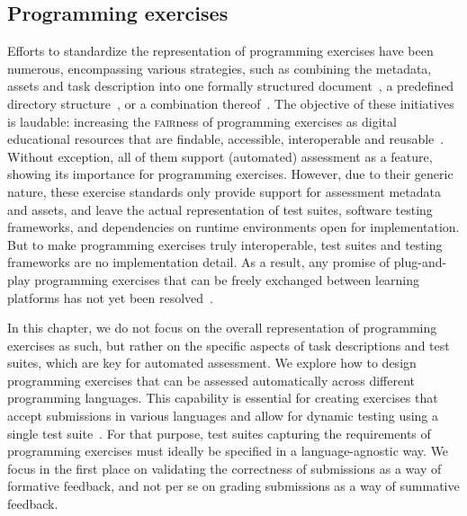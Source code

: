 \documentclass[../main]{subfiles}
\begin{document}
\subsection{Programming exercises}\label{subsec:dsl-programming-exercises}

Efforts to standardize the representation of programming exercises have been numerous, encompassing various strategies, such as combining the metadata, assets and task description into one formally structured document~\autocite{mishraProgrammingExerciseMarkup2023,paivaAnotherProgrammingExercises2020,queirosPexilProgrammingExercises2011,swachaSIPEDomainspecificLanguage2018}, a predefined directory structure~\autocite{verhoeffProgrammingTaskPackages2008}, or a combination thereof~\autocite{edwardsDevelopingCommonFormat2008a,strickrothProFormAXMLbasedExchange2015}.
The objective of these initiatives is laudable: increasing the \textsc{fair}ness of programming exercises as digital educational resources that are findable, accessible, interoperable and reusable~\autocite{wilkinsonFAIRGuidingPrinciples2016}.
Without exception, all of them support (automated) assessment as a feature, showing its importance for programming exercises.
However, due to their generic nature, these exercise standards only provide support for assessment metadata and assets, and leave the actual representation of test suites, software testing frameworks, and dependencies on runtime environments open for implementation.
But to make programming exercises truly interoperable, test suites and testing frameworks are no implementation detail.
As a result, any promise of plug-and-play programming exercises that can be freely exchanged between learning platforms has not yet been resolved~\autocite{ala-mutkaSurveyAutomatedAssessment2005,ihantolaReviewRecentSystems2010,messerAutomatedGradingFeedback2024,paivaAutomatedAssessmentComputer2022}.

In this chapter, we do not focus on the overall representation of programming exercises as such, but rather on the specific aspects of task descriptions and test suites, which are key for automated assessment.
We explore how to design programming exercises that can be assessed automatically across different programming languages.
This capability is essential for creating exercises that accept submissions in various languages and allow for dynamic testing using a single test suite~\autocite{staubitzPracticalProgrammingExercises2015}.
For that purpose, test suites capturing the requirements of programming exercises must ideally be specified in a language-agnostic way.
We focus in the first place on validating the correctness of submissions as a way of formative feedback, and not per se on grading submissions as a way of summative feedback.
\end{document}
